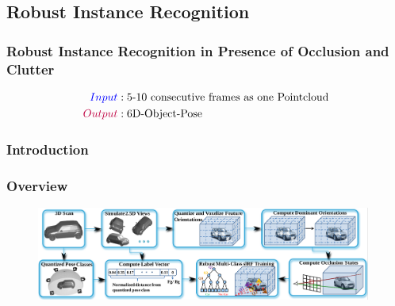 \documentclass[xcolor=dvipsnames]{beamer}
\begin{document}
\subsection{Robust Instance Recognition}
{ 
\begin{frame}
	\frametitle{Robust Instance Recognition in Presence of Occlusion and Clutter}
	\Large
	
	\begin{align*}
		\textcolor{blue}{Input}&:  \text{5-10 consecutive frames as one Pointcloud} \\
		\textcolor{purple}{Output}&: \text{6D-Object-Pose}
	\end{align*}
\end{frame}}
\subsubsection{Introduction}
\begin{frame}
	\frametitle{Overview}
	\begin{figure}
	\includegraphics[width=11cm]{img/rir_2.png}
	\end{figure}
\end{frame}
\end{document}
